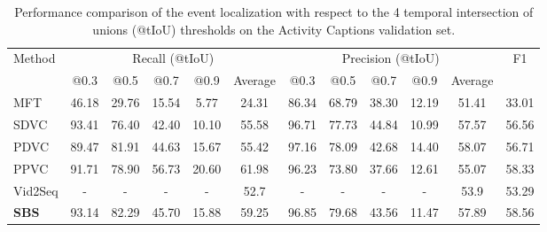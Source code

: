 \begin{sidewaystable}
  \centering
  \caption{
    Performance comparison of the event localization with respect to the 4 temporal intersection of unions (@tIoU) thresholds on the Activity Captions validation set.
  }
  \begin{tabular}{@{}l|ccccc|ccccc|c@{}}
    \hline
    \multirow{2}{*}{Method}        & \multicolumn{5}{|c|}{Recall (@tIoU)} & \multicolumn{5}{|c|}{Precision (@tIoU)} & \multirow{2}{*}{F1}                                                                     \\
                                   & @0.3                                 & @0.5                                    & @0.7                & @0.9  & Average & @0.3  & @0.5  & @0.7  & @0.9  & Average &       \\
    \hline
    MFT \cite{xiong2018move}       & 46.18                                & 29.76                                   & 15.54               & 5.77  & 24.31   & 86.34 & 68.79 & 38.30 & 12.19 & 51.41   & 33.01 \\
    SDVC \cite{mun2019streamlined} & 93.41                                & 76.40                                   & 42.40               & 10.10 & 55.58   & 96.71 & 77.73 & 44.84 & 10.99 & 57.57   & 56.56 \\
    PDVC \cite{wang2021end}        & 89.47                                & 81.91                                   & 44.63               & 15.67 & 55.42   & 97.16 & 78.09 & 42.68 & 14.40 & 58.07   & 56.71 \\
    PPVC \cite{choi2022parallel}   & 91.71                                & 78.90                                   & 56.73               & 20.60 & 61.98   & 96.23 & 73.80 & 37.66 & 12.61 & 55.07   & 58.33 \\
    Vid2Seq \cite{yang2023vid2seq} & -                                    & -                                       & -                   & -     & 52.7    & -     & -     & -     & -     & 53.9    & 53.29 \\
    \textbf{SBS}                   & 93.14                                & 82.29                                   & 45.70               & 15.88 & 59.25   & 96.85 & 79.68 & 43.56 & 11.47 & 57.89   & 58.56 \\
    \hline
  \end{tabular}
  \label{tab:eval_event_localizer}
\end{sidewaystable}

